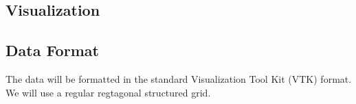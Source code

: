 
\subsection{Visualization}




\subsection{Data Format}

The data will be formatted in the standard Visualization Tool Kit (VTK) format. We will use a regular regtagonal structured grid.